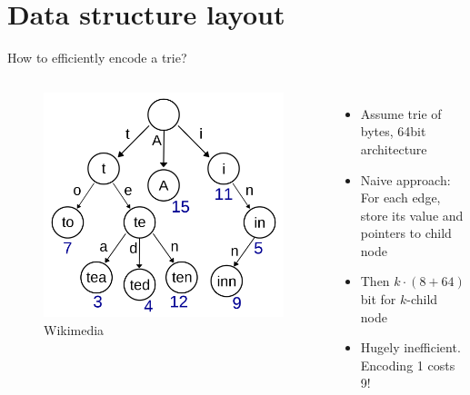 \documentclass{beamer}
\begin{document}
\section{Data structure layout}

\begin{frame}{How to efficiently encode a trie?}
		\begin{columns}
				\begin{figure}
						\centering
						\includegraphics[width=\textwidth]{resources/trie.png}
						\caption{Wikimedia \autocite{booyabazookaTrieExampleSvg}}
				\end{figure}
				\begin{itemize}
						\item Assume trie of bytes, 64bit architecture
						\item Naive approach: For each edge, store its value and
								pointers to child node
						\item Then $k \cdot (8 + 64)$ bit for $k$-child node
						\item Hugely inefficient. Encoding \qty{1}{\byte} costs
								\qty{9}{\byte}!
				\end{itemize}
		\end{columns}
\end{frame}
\end{document}
